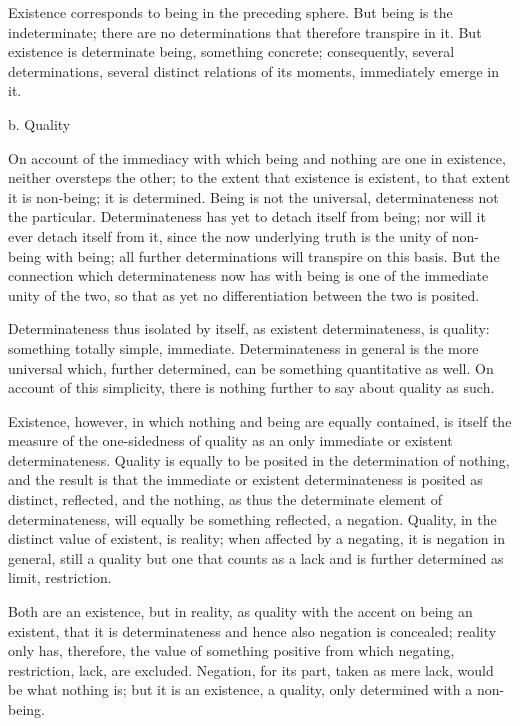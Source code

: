 Existence corresponds to being in the preceding sphere.
But being is the indeterminate;
there are no determinations that therefore transpire in it.
But existence is determinate being, something concrete;
consequently, several determinations,
several distinct relations of its moments,
immediately emerge in it.

b. Quality

On account of the immediacy
with which being and nothing are
one in existence, neither oversteps the other;
to the extent that existence is existent,
to that extent it is non-being;
it is determined.
Being is not the universal,
determinateness not the particular.
Determinateness has yet to detach itself from being;
nor will it ever detach itself from it,
since the now underlying truth is
the unity of non-being with being;
all further determinations will transpire on this basis.
But the connection which determinateness now has
with being is one of the immediate unity of the two,
so that as yet no differentiation between the two is posited.

Determinateness thus isolated by itself,
as existent determinateness, is quality:
something totally simple, immediate.
Determinateness in general is the more universal
which, further determined, can be
something quantitative as well.
On account of this simplicity,
there is nothing further to say
about quality as such.

Existence, however, in which
nothing and being are equally contained,
is itself the measure of the one-sidedness of
quality as an only immediate or existent determinateness.
Quality is equally to be posited in the determination of nothing,
and the result is that the immediate or existent determinateness is
posited as distinct, reflected, and the nothing,
as thus the determinate element of determinateness,
will equally be something reflected, a negation.
Quality, in the distinct value of existent, is reality;
when affected by a negating, it is negation in general,
still a quality but one that counts as a lack
and is further determined as limit, restriction.

Both are an existence, but in reality,
as quality with the accent on being an existent,
that it is determinateness
and hence also negation is concealed;
reality only has, therefore,
the value of something positive
from which negating, restriction, lack, are excluded.
Negation, for its part, taken as mere lack,
would be what nothing is;
but it is an existence, a quality,
only determined with a non-being.

